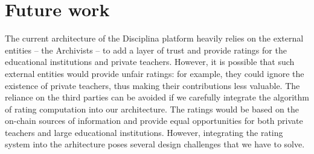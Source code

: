 \section{Future work}
The current architecture of the Disciplina platform heavily relies on the external entities -- the Archivists -- to add a layer of trust and provide ratings for the educational institutions and private teachers. However, it is possible that such external entities would provide unfair ratings: for example, they could ignore the existence of private teachers, thus making their contributions less valuable. The reliance on the third parties can be avoided if we carefully integrate the algorithm of rating computation into our architecture. The ratings would be based on the on-chain sources of information and provide equal opportunities for both private teachers and large educational institutions. However, integrating the rating system into the arhitecture poses several design challenges that we have to solve.
